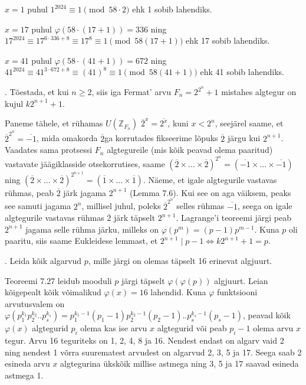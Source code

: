 \documentclass[a4paper, 10pt]{article}
\newcommand{\Z}{\mathbb{Z}}
\newcommand{\w}{\overline}
\begin{document}
$x=1$ puhul $1^{2024}\equiv1\pmod{58\cdot2}$ ehk 1 sobib lahendiks.

$x=17$ puhul $\varphi(58\cdot(17+1))=336$ ning $17^{2024}\equiv17^{6\cdot336+8}\equiv17^8\equiv1\pmod{58(17+1)}$ ehk 17 sobib lahendiks.

$x=41$ puhul $\varphi(58\cdot(41+1))=672$ ning $41^{2024}\equiv41^{3\cdot672+8}\equiv(41)^8\equiv1\pmod{58(41+1)}$ ehk 41 sobib lahendiks.
\bigskip

. Tõestada, et kui $n\geq 2$, siis iga Fermat' arvu $F_n = 2^{2^n}+1$ mistahes algtegur on kujul $k2^{n+1}+1$. 

\bigskip
Paneme tähele, et rühamas $U(\Z_{F_n})$ $\w{2}^x= \w{2^x}$, kuni $x<2^n$, seejärel saame, et $\w{2}^{2^n}= \w{-1} $, mida omakorda $\w{2}$ga korrutades fikseerime lõpuks $\w{2}$ järgu kui $2^{n+1}$. Vaadates sama protsessi $F_n$ algtegureile (mis kõik peavad olema paaritud) vastavate jäägiklasside otsekorrutises, saame $(\w{2}\times ... \times \w{2})^{2^{n}}=(\w{-1}\times ...\times \w{-1})$ ning $(\w{2}\times ... \times \w{2})^{2^{n+1}}=(\w{1}\times ...\times \w{1})$. Näeme, et igale algtegurile vastavas rühmas, peab $\w{2}$ järk jagama $2^{n+1}$ (Lemma 7.6). Kui see on aga väiksem, peaks see samuti jagama $2^{n}$, millisel juhul, poleks $\w{2}^{2^n}$ selles rühmas $\w{-1}$, seega on igale algtegurile vastavas rühmas $\w{2}$ järk täpselt $2^{n+1}$. Lagrange'i teoreemi järgi peab  $2^{n+1}$ jagama selle rühma järku, milleks on $\varphi(p^m)=(p-1)p^{m-1}$. Kuna $p$ oli paaritu, siis saame Eukleidese lemmast, et $2^{n+1}\mid p-1\Leftrightarrow k2^{n+1}+1=p$.


\bigskip

. Leida kõik algarvud $p$, mille järgi on olemas täpselt 16 erinevat algjuurt. 

\bigskip
Teoreemi 7.27 leidub mooduli $p$ järgi täpselt $\varphi(\varphi(p))$ algjuurt. Leian kõigepealt kõik võimalikud $\varphi(x)=16$ lahendid. Kuna $\varphi$ funktsiooni arvutusvalem on $\varphi(p_1^{k_1}p_2^{k_2}..p_s^{k_s})=p_1^{k_1-1}(p_1-1)p_2^{k_2-1}(p_2-1)..p_s^{k_s-1}(p_s-1)$, peavad kõik $\varphi(x)$ algtegurid $p_i$ olema kas ise arvu $x$ algtegurid või peab $p_i-1$ olema arvu $x$ tegur. Arvu 16 teguriteks on 1, 2, 4, 8 ja 16. Nendest endast on algarv vaid 2 ning nendest 1 võrra suurematest arvudest on algarvud 2, 3, 5 ja 17. Seega saab 2 esineda arvu $x$ algtegurina ükskõik millise astmega ning 3, 5 ja 17 saavad esineda astmega 1.
\end{document}

